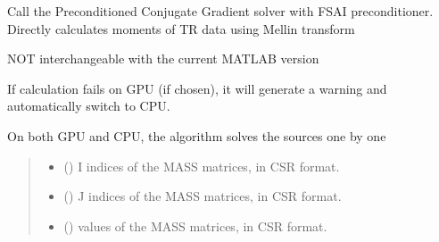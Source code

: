 \documentclass[letterpaper,10pt,english]{sphinxmanual}
\begin{document}
\begin{fulllineitems}
\label{\detokenize{_autosummary/nirfasterff.math.get_field_TRmoments:nirfasterff.math.get_field_TRmoments}}
\pysigstartsignatures
{}
\pysigstopsignatures
\sphinxAtStartPar
Call the Preconditioned Conjugate Gradient solver with FSAI preconditioner. Directly calculates moments of TR data using Mellin transform

\sphinxAtStartPar
NOT interchangeable with the current MATLAB version

\sphinxAtStartPar
If calculation fails on GPU (if chosen), it will generate a warning and automatically switch to CPU.

\sphinxAtStartPar
On both GPU and CPU, the algorithm solves the sources one by one
\begin{quote}\begin{description}
\begin{itemize}
\item {} 
\sphinxAtStartPar
{} (\sphinxstyleliteralemphasis{\sphinxupquote{, }}) \textendash{} I indices of the MASS matrices, in CSR format.

\item {} 
\sphinxAtStartPar
{} (\sphinxstyleliteralemphasis{\sphinxupquote{, }}) \textendash{} J indices of the MASS matrices, in CSR format.

\item {} 
\sphinxAtStartPar
{} () \textendash{} 
\sphinxAtStartPar
values of the MASS matrices, in CSR format.


\end{itemize}
\end{description}
\end{quote}
\end{fulllineitems}
\end{document}
